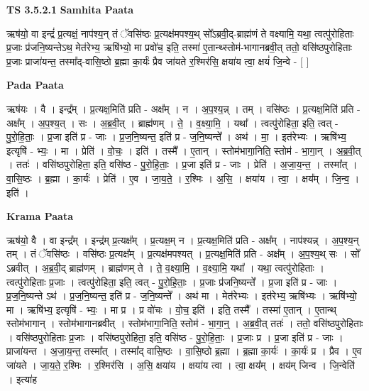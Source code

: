 \documentclass[17pt]{extarticle}
\begin{document}
\textbf{TS 3.5.2.1 } \newline
\textbf{Samhita Paata} \newline

ऋष॑यो॒ वा इन्द्रं॑ प्र॒त्यक्षं॒ नाप॑श्य॒न् तं ॅवसि॑ष्ठः प्र॒त्यक्ष॑मपश्य॒थ् सो᳚ऽब्रवी॒द्-ब्राह्म॑णं ते वक्ष्यामि॒ यथा॒ त्वत्पु॑रोहिताः प्र॒जाः प्र॑जनि॒ष्यन्तेऽथ॒ मेत॑रेभ्य॒ ऋषि॑भ्यो॒ मा प्रवो॑च॒ इति॒ तस्मा॑ ए॒तान्थ्स्तोम॑-भागानब्रवी॒त् ततो॒ वसि॑ष्ठपुरोहिताः प्र॒जाः प्राजा॑यन्त॒ तस्मा᳚द्-वासि॒ष्ठो ब्र॒ह्मा का॒र्यः॑ प्रैव जा॑यते र॒श्मिर॑सि॒ क्षया॑य त्वा॒ क्षयं॑ जि॒न्वे - [  ] \newline

\textbf{Pada Paata} \newline

ऋष॑यः । वै । इन्द्र᳚म् । प्र॒त्यक्ष॒मिति॑ प्रति - अक्ष᳚म् । न । अ॒प॒श्य॒न्न् । तम् । वसि॑ष्ठः । प्र॒त्यक्ष॒मिति॑ प्रति - अक्ष᳚म् । अ॒प॒श्य॒त् । सः । अ॒ब्र॒वी॒त् । ब्राह्म॑णम् । ते॒ । व॒क्ष्या॒मि॒ । यथा᳚ । त्वत्पु॑रोहिता॒ इति॒ त्वत् - पु॒रो॒हि॒ताः॒ । प्र॒जा इति॑ प्र - जाः । प्र॒ज॒नि॒ष्यन्त॒ इति॑ प्र - ज॒नि॒ष्यन्ते᳚ । अथ॑ । मा॒ । इत॑रेभ्यः । ऋषि॑भ्य॒ इत्यृषि॑ - भ्यः॒ । मा । प्रेति॑ । वो॒चः॒ । इति॑ । तस्मै᳚ । ए॒तान् । स्तोम॑भागा॒निति॒ स्तोम॑ - भा॒गा॒न् । अ॒ब्र॒वी॒त् । ततः॑ । वसि॑ष्ठपुरोहिता॒ इति॒ वसि॑ष्ठ - पु॒रो॒हि॒ताः॒ । प्र॒जा इति॑ प्र - जाः । प्रेति॑ । अ॒जा॒य॒न्त॒ । तस्मा᳚त् । वा॒सि॒ष्ठः । ब्र॒ह्मा । का॒र्यः॑ । प्रेति॑ । ए॒व । जा॒य॒ते॒ । र॒श्मिः । अ॒सि॒ । क्षया॑य । त्वा॒ । क्षय᳚म् । जि॒न्व॒ । इति॑ ।  \newline


\textbf{Krama Paata} \newline

ऋष॑यो॒ वै । वा इन्द्र᳚म् । इन्द्र॑म् प्र॒त्यक्ष᳚म् । प्र॒त्यक्ष॒म् न । प्र॒त्यक्ष॒मिति॑ प्रति - अक्ष᳚म् । नाप॑श्यन्न् । अ॒प॒श्य॒न् तम् । तं ॅवसि॑ष्ठः । वसि॑ष्ठः प्र॒त्यक्ष᳚म् । प्र॒त्यक्ष॑मपश्यत् । प्र॒त्यक्ष॒मिति॑ प्रति - अक्ष᳚म् । अ॒प॒श्य॒थ् सः । सो᳚ ऽब्रवीत् । अ॒ब्र॒वी॒द् ब्राह्म॑णम् । ब्राह्म॑णम् ते । ते॒ व॒क्ष्या॒मि॒ । व॒क्ष्या॒मि॒ यथा᳚ । यथा॒ त्वत्पु॑रोहिताः । त्वत्पु॑रोहिताः प्र॒जाः । त्वत्पु॑रोहिता॒ इति॒ त्वत् - पु॒रो॒हि॒ताः॒ । प्र॒जाः प्र॑जनि॒ष्यन्ते᳚ । प्र॒जा इति॑ प्र - जाः । प्र॒ज॒नि॒ष्यन्ते ऽथ॑ । प्र॒ज॒नि॒ष्यन्त॒ इति॑ प्र - ज॒नि॒ष्यन्ते᳚ । अथ॑ मा । मेत॑रेभ्यः । इत॑रेभ्य॒ ऋषि॑भ्यः । ऋषि॑भ्यो॒ मा । ऋषि॑भ्य॒ इत्यृषि॑ - भ्यः॒ । मा प्र । प्र वो॑चः । वो॒च॒ इति॑ । इति॒ तस्मै᳚ । तस्मा॑ ए॒तान् । ए॒तान्थ् स्तोम॑भागान् । स्तोम॑भागानब्रवीत् । स्तोम॑भागा॒निति॒ स्तोम॑ - भा॒गा॒न्॒ । अ॒ब्र॒वी॒त् ततः॑ । ततो॒ वसि॑ष्ठपुरोहिताः । वसि॑ष्ठपुरोहिताः प्र॒जाः । वसि॑ष्ठपुरोहिता॒ इति॒ वसि॑ष्ठ - पु॒रो॒हि॒ताः॒ । प्र॒जाः प्र । प्र॒जा इति॑ प्र - जाः । प्राजा॑यन्त । अ॒जा॒य॒न्त॒ तस्मा᳚त् । तस्मा᳚द् वासि॒ष्ठः । वा॒सि॒ष्ठो ब्र॒ह्मा । ब्र॒ह्मा का॒र्यः॑ । का॒र्यः॑ प्र । प्रैव । ए॒व जा॑यते । जा॒य॒ते॒ र॒श्मिः । र॒श्मिर॑सि । अ॒सि॒ क्षया॑य । क्षया॑य त्वा । त्वा॒ क्षय᳚म् । क्षय॑म् जिन्व । जि॒न्वेति॑ । इत्या॑ह \newline
\end{document}
